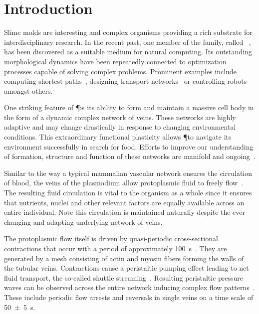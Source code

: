 
\section{Introduction}

  Slime molds are interesting and complex organisms providing a rich substrate for interdisciplinary research. In the recent past, one member of the family, called \Pp~\cite{howard1931life}, has been discovered as a suitable medium for natural computing. Its outstanding morphological dynamics have been repeatedly connected to optimization processes capable of solving complex problems. Prominent examples include computing shortest paths~\cite{nakagaki2000intelligence,tero2006physarum,bonifaci2012physarum}, designing transport networks~\cite{tero2010rules,nakagaki2007minimum} or controlling robots~\cite{tsuda2004robust} amongst others. 

  One striking feature of \P is its ability to form and maintain a massive cell body in the form of a dynamic complex network of veins. These networks are highly adaptive and may change drastically in response to changing environmental conditions. This extraordinary functional plasticity allows \P to navigate its environment successfully in search for food. Efforts to improve our understanding of formation, structure and function of these networks are manifold and ongoing~\cite{Marwan419,tero2010rules,alim2013random,baumgarten2010plasmodial,baumgarten2013functional}.

  Similar to the way a typical mammalian vascular network ensures the circulation of blood, the veins of the plasmodium allow protoplasmic fluid to freely flow~\cite{kamiya1958studies}. The resulting fluid circulation is vital to the organism as a whole since it ensures that nutrients, nuclei and other relevant factors are equally available across an entire individual. Note this circulation is maintained naturally despite the ever changing and adapting underlying network of veins. 

  The protoplasmic flow itself is driven by quasi-periodic cross-sectional contractions that occur with a period of approximately \SI{100}{\second}~\cite{stewart1959protoplasmic,Wohlfarth-Bottermann15}. They are generated by a mesh consisting of actin and myosin fibers forming the walls of the tubular veins. Contractions cause a peristaltic pumping effect leading to net fluid transport, the so-called shuttle streaming~\cite{kamiya1959motive}. Resulting peristaltic pressure waves can be observed across the entire network inducing complex flow patterns~\cite{Nakagaki2000195}. These include periodic flow arrests and reversals in single veins on a time scale of \SI{50 \pm 5}{\second}. 

